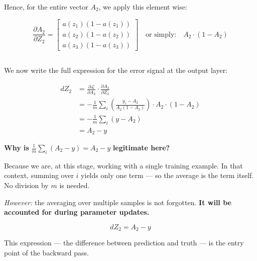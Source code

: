 \documentclass[11pt]{article}
\begin{document}
\vspace{1em}

Hence, for the entire vector \( A_2 \), we apply this element wise:

\[
\frac{\partial A_2}{\partial Z_2} =
\begin{bmatrix}
a(z_1)(1 - a(z_1)) \\
a(z_2)(1 - a(z_2)) \\
a(z_3)(1 - a(z_3))
\end{bmatrix}
\quad \text{or simply:} \quad
A_2 \cdot (1 - A_2)
\]

\vspace{1em}
\subsection*{}

We now write the full expression for the error signal at the output layer:

\[
\begin{aligned}
dZ_2 
&= \frac{\partial \mathcal{L}}{\partial A_2} \cdot \frac{\partial A_2}{\partial Z_2} \\
&= -\frac{1}{m} \sum_i \left( \frac{y_i - A_2}{A_2(1 - A_2)} \right) \cdot A_2 \cdot (1 - A_2) \\
&= -\frac{1}{m} \sum_i (y - A_2) \\
&= A_2 - y
\end{aligned}
\]

\vspace{1em}

\textbf{Why is} \( \frac{1}{m} \sum_i (A_2 - y) = A_2 - y \) \textbf{legitimate here?}

\vspace{0.5em}

Because we are, at this stage, working with a single training example.  
In that context, summing over \( i \) yields only one term — so the average is the term itself.  
No division by \( m \) is needed.  

\vspace{0.5em}

\textit{However:} the averaging over multiple samples is not forgotten.  
\textbf{It will be accounted for during parameter updates.}

\vspace{1.5em}

\begin{tcolorbox}[colback=blue!5, colframe=blue!80!black, title=Result — Output Layer Error]
\[
\boxed{dZ_2 = A_2 - y}
\]

This expression — the difference between prediction and truth —  
is the entry point of the backward pass.
\end{tcolorbox}
\end{document}
